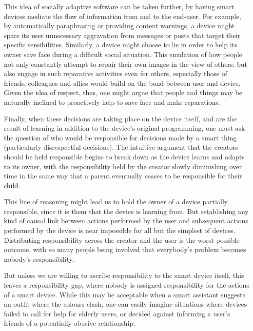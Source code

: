 \documentclass{IETpaper}
\begin{document}
This idea of socially adaptive software can be taken further, by having smart devices mediate the flow of information from and to the end-user. For example, by automatically paraphrasing or providing content warnings, a device might spare its user unnecessary aggravation from messages or posts that target their specific sensibilities. Similarly, a device might choose to lie in order to help its owner save face during a difficult social situation. This emulation of how people not only constantly attempt to repair their own images in the view of others, but also engage in such reparative activities even for others, especially those of friends, colleagues and allies would build on the bond between user and device. Given the idea of respect, thus, one might argue that people and things may be naturally inclined to proactively help to save face and make reparations.

Finally, when these decisions are taking place on the device itself, and are the result of learning in addition to the device’s original programming, one must ask the question of who would be responsible for decisions made by a smart thing (particularly disrespectful decisions). The intuitive argument that the creators should be held responsible begins to break down as the device learns and adapts to its owner, with the responsibility held by the creator slowly diminishing over time in the same way that a parent eventually ceases to be responsible for their child.

This line of reasoning might lead us to hold the owner of a device partially responsible, since it is them that the device is learning from. But establishing any kind of causal link between actions performed by the user and subsequent actions performed by the device is near impossible for all but the simplest of devices. Distributing responsibility across the creator and the user is the worst possible outcome, with so many people being involved that everybody’s problem becomes nobody’s responsibility.


But unless we are willing to ascribe responsibility to the smart device itself, this leaves a responsibility gap, where nobody is assigned responsibility for the actions of a smart device. While this may be acceptable when a smart assistant suggests an outfit where the colours clash, one can easily imagine situations where devices failed to call for help for elderly users, or decided against informing a user’s friends of a potentially abusive relationship.
\end{document}
